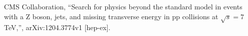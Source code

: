 \begin{thebibliography}{10}

 CMS Collaboration, ``Search for physics beyond the standard model in events with a Z boson, jets, and missing transverse energy in pp collisions at $\sqrt{s} = 7$ TeV,'', 	arXiv:1204.3774v1 [hep-ex].

\end{thebibliography}
